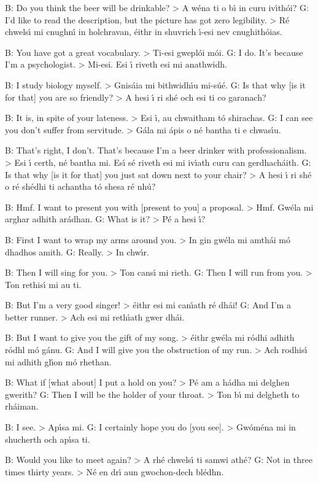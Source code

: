 B: Do you think the beer will be drinkable? > A w\'{e}na ti o b\'{\i} in curu iv\'{\i}th\'{o}i?
G: I'd like to read the description, but the picture has got zero legibility. > R\'{e} chwels\'{\i} mi cnughn\'{\i} in holchravan, \'{e}ithr in shuvrich \'{\i}-esi nev cnughith\'{o}ias.

B: You have got a great vocabulary. > Ti-esi gwepl\'{o}i m\'{o}i.
G: I do. It's because I'm a psychologist. > Mi-esi. Esi \'{\i} riveth esi mi anathwidh.

B: I study biology myself. > Gnis\'{a}ia mi bithwidh\'{\i}u mi-s\'{u}\'{e}.
G: Is that why [is it for that] you are so friendly? > A hesi \'{\i} ri sh\'{e} och esi ti co garanach?

B: It is, in spite of your lateness. > Esi \'{\i}, au chwaitham t\'{o} shirachas.
G: I can see you don't suffer from servitude. > G\'{a}la mi \'{a}pis o n\'{e} bantha ti e chwas\'{\i}u.

B: That's right, I don't. That's because I'm a beer drinker with professionalism. > Esi \'{\i} certh, n\'{e} bantha mi. Es\'{\i} s\'{e} riveth esi mi iv\'{\i}ath curu can gerdhach\'{a}ith.
G: Is that why [is it for that] you just sat down next to your chair? > A hesi \'{\i} ri sh\'{e} o r\'{e} sh\'{e}dhi ti achantha t\'{o} shesa r\'{e} nh\'{u}?

B: Hmf. I want to present you with [present to you] a proposal. > Hmf. Gw\'{e}la mi arghar adhith ar\'{a}dhan.
G: What is it? > P\'{e} a hesi \'{\i}?

B: First I want to wrap my arms around you. > In gin gw\'{e}la mi amth\'{a}i m\'{o} dhadhos amith.
G: Really. > In chw\'{\i}r.

B: Then I will sing for you. > Ton cans\'{\i} mi rieth.
G: Then I will run from you. > Ton rethis\'{\i} mi au ti.

B: But I'm a very good singer! > \'{e}ithr esi mi can\'{\i}ath r\'{e} dh\'{a}i!
G: And I'm a better runner. > Ach esi mi reth\'{\i}ath gwer dh\'{a}i.

B: But I want to give you the gift of my song. > \'{e}ithr gw\'{e}la mi r\'{o}dhi adhith r\'{o}dhl m\'{o} g\'{a}nu.
G: And I will give you the obstruction of my run. > Ach rodhis\'{\i} mi adhith gl\'{\i}on m\'{o} rhethan.

B: What if [what about] I put a hold on you? > P\'{e} am a h\'{a}dha mi delghen gwerith?
G: Then I will be the holder of your throat. > Ton b\'{\i} mi delgheth to rh\'{a}iman.

B: I see. > Ap\'{\i}sa mi.
G: I certainly hope you do [you see]. > Gw\'{o}m\'{e}na mi in shucherth och ap\'{\i}sa ti.

B: Would you like to meet again? > A rh\'{e} chwels\'{\i} ti samwi ath\'{e}?
G: Not in three times thirty years. > N\'{e} en dr\'{\i} aun gwochon-dech bl\'{e}dhn.
